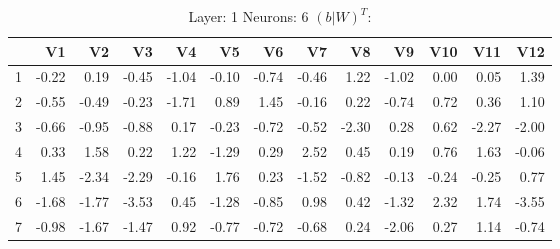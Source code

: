 \begin{table}[ht]
\centering
\begin{tabular}{rrrrrrrrrrrrr}
  \hline
 & V1 & V2 & V3 & V4 & V5 & V6 & V7 & V8 & V9 & V10 & V11 & V12 \\ 
  \hline
1 & -0.22 & 0.19 & -0.45 & -1.04 & -0.10 & -0.74 & -0.46 & 1.22 & -1.02 & 0.00 & 0.05 & 1.39 \\ 
  2 & -0.55 & -0.49 & -0.23 & -1.71 & 0.89 & 1.45 & -0.16 & 0.22 & -0.74 & 0.72 & 0.36 & 1.10 \\ 
  3 & -0.66 & -0.95 & -0.88 & 0.17 & -0.23 & -0.72 & -0.52 & -2.30 & 0.28 & 0.62 & -2.27 & -2.00 \\ 
  4 & 0.33 & 1.58 & 0.22 & 1.22 & -1.29 & 0.29 & 2.52 & 0.45 & 0.19 & 0.76 & 1.63 & -0.06 \\ 
  5 & 1.45 & -2.34 & -2.29 & -0.16 & 1.76 & 0.23 & -1.52 & -0.82 & -0.13 & -0.24 & -0.25 & 0.77 \\ 
  6 & -1.68 & -1.77 & -3.53 & 0.45 & -1.28 & -0.85 & 0.98 & 0.42 & -1.32 & 2.32 & 1.74 & -3.55 \\ 
  7 & -0.98 & -1.67 & -1.47 & 0.92 & -0.77 & -0.72 & -0.68 & 0.24 & -2.06 & 0.27 & 1.14 & -0.74 \\ 
   \hline
\end{tabular}
\caption{Layer: 1 Neurons: 6  $(b|W)^T$: 
} 
\end{table}
